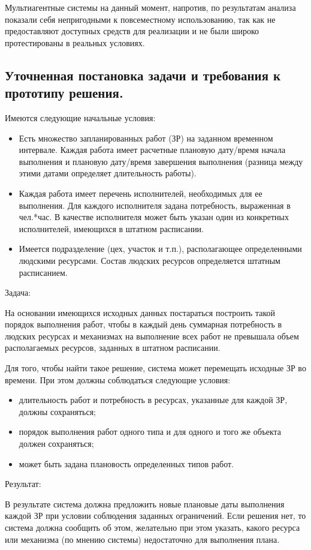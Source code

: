 Мультиагентные системы на данный момент, напротив, по результатам анализа показали себя непригодными к повсеместному использованию, так как не предоставляют доступных средств для реализации и не были широко протестированы в реальных условиях.


\subsection{Уточненная постановка задачи и требования к прототипу решения.}
Имеются следующие начальные условия:
\begin{itemize}
	\item Есть множество запланированных работ (ЗР) на заданном временном интервале. Каждая работа имеет расчетные плановую дату/время начала выполнения и плановую дату/время завершения выполнения (разница между этими датами определяет длительность работы).
	\item Каждая работа имеет перечень исполнителей, необходимых для ее выполнения. Для каждого исполнителя задана потребность, выраженная в чел.*час.  В качестве исполнителя может быть указан один из конкретных исполнителей, имеющихся в штатном расписании.
	\item Имеется подразделение (цех, участок и т.п.), располагающее определенными людскими ресурсами. Состав людских ресурсов определяется штатным расписанием.
\end{itemize}
	Задача:
	
	На основании имеющихся исходных данных постараться построить такой порядок выполнения работ, чтобы в каждый день суммарная потребность в людских ресурсах и механизмах на выполнение всех работ не превышала объем располагаемых ресурсов, заданных в штатном расписании.
	
	Для того, чтобы найти такое решение, система может перемещать исходные ЗР во времени. При этом должны соблюдаться следующие условия:
	\begin{itemize}
		\item длительность работ и потребность в ресурсах, указанные для каждой ЗР, должны сохраняться;
		\item порядок выполнения работ одного типа и для одного и того же объекта должен сохраняться;
		\item может быть задана плановость определенных типов работ.
	\end{itemize}

	Результат:
	
	В результате система должна предложить новые плановые даты выполнения каждой ЗР при условии соблюдения заданных ограничений. Если решения нет, то система должна сообщить об этом, желательно при этом указать, какого ресурса или механизма (по мнению системы) недостаточно для выполнения плана.
	

